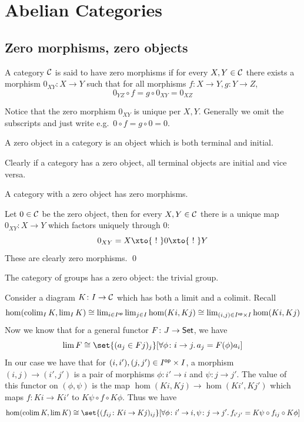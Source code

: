 \section{Abelian Categories}

\subsection{Zero morphisms, zero objects}

\bdefn

    A category ${{\cal C}}$ is said to have {\emphcolor zero morphisms} if for every $X,Y\in{{\cal C}}$ there exists a morphism $0_{XY}\colon X\to Y$ such that
    for all morphisms $f\colon X\to Y,g\colon Y\to Z$,
    $$ 0_{YZ}\circ f = g\circ0_{XY} = 0_{XZ} $$

\edefn

Notice that the zero morphism $0_{XY}$ is unique per $X,Y$.
Generally we omit the subscripts and just write e.g.\ $0\circ f=g\circ 0=0$.

\bdefn

    A {\emphcolor zero object} in a category is an object which is both terminal and initial.

\edefn

Clearly if a category has a zero object, all terminal objects are initial and vice versa.

\bprop

    A category with a zero object has zero morphisms.

\eprop

\bproof

    Let $0\in{{\cal C}}$ be the zero object, then for every $X,Y\in{{\cal C}}$ there is a unique map $0_{XY}\colon X\to Y$ which factors uniquely through $0$:
    $$ 0_{XY} = X\xto{\ !\ }0\xto{\ !\ }Y $$
    These are clearly zero morphisms.
    \qed

\eproof

\bexam

    The category of groups has a zero object: the trivial group.

\eexam

Consider a diagram $K\colon I\to{{\cal C}}$ which has both a limit and a colimit.
Recall
$$ \hom(\mathop{\rm colim}\nolimits_I K,\mathop{\rm lim}\nolimits_I K) \cong \mathop{\rm lim}\nolimits_{i\in I^{\sf op}}\mathop{\rm lim}\nolimits_{j\in I}\hom(Ki,Kj) \cong \mathop{\rm lim}\nolimits_{(i,j)\in I^{\sf op}\times I}\hom(Ki,Kj) $$
Now we know that for a general functor $F\colon J\to{\sf Set}$, we have
$$ \lim F \cong \set{(a_j\in Fj)_j}[\forall\phi\colon i\to j.\,a_j=F(\phi)a_i] $$
In our case we have that for $(i,i'),(j,j')\in I^{\sf op}\times I$, a morphism $(i,j)\to(i',j')$ is a pair of morphisms $\phi\colon i'\to i$ and $\psi\colon j\to j'$.
The value of this functor on $(\phi,\psi)$ is the map $\hom(Ki,Kj)\to\hom(Ki',Kj')$ which maps $f\colon Ki\to Ki'$ to $K\psi\circ f\circ K\phi$.
Thus we have
$$ \hom(\colim K,\lim K) \cong \set{(f_{ij}\colon Ki\to Kj)_{ij}}[\forall\phi\colon i'\to i,\psi\colon j\to j'.\,f_{i'j'}=K\psi\circ f_{ij}\circ K\phi] $$

